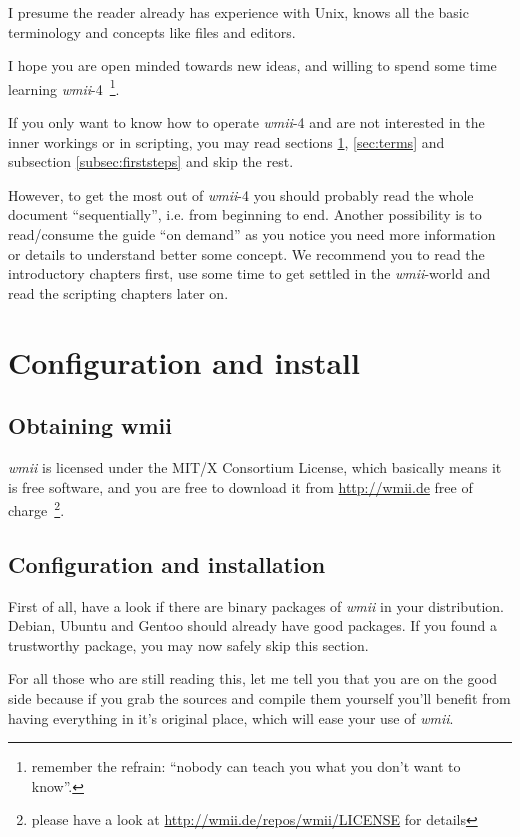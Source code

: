 \documentclass[12pt,a4paper]{article} %
\newcommand{\hrefx}[1]{\href{#1}{#1}} %
\newcommand{\wmii}{\emph{wmii}}
\begin{document}
    I presume the reader already has experience with Unix, knows all
    the basic terminology and concepts like files and editors.

    I hope you are open minded towards new ideas, and willing to spend some
    time learning \wmii-4~\footnote{remember the refrain: ``nobody
    can teach you what you don't want to know''.}.

    If you only want to know how to operate \wmii-4 and are not
    interested in the inner workings or in scripting, you may read
    sections \ref{sec:conf&install}, \ref{sec:terms} and subsection
    \ref{subsec:firststeps} and skip the rest.

    However, to get the most out of \wmii-4 you should probably read
    the whole document ``sequentially'', i.e. from beginning to end.
    Another possibility is to read/consume the guide ``on demand'' as
    you notice you need more information or details to understand
    better some concept. We recommend you to read the introductory
    chapters first, use some time to get settled in the \wmii-world
    and read the scripting chapters later on.
    
    \section{Configuration and install}
    \label{sec:conf&install}

    \subsection{Obtaining wmii}

    \wmii{} is licensed under the MIT/X Consortium License, which
    basically means it is free software, and you are free to download
    it from \hrefx{http://wmii.de} free of charge~\footnote{ please have
      a look at \hrefx{http://wmii.de/repos/wmii/LICENSE}  for
      details}.
    
    \subsection{Configuration and installation}
    
    First of all, have a look if there are binary packages of \wmii{} in
    your distribution. Debian, Ubuntu and Gentoo should already have
    good packages. If you found a trustworthy package, you may now safely
    skip this section.

    For all those who are still reading this, let me tell you that you are
    on the good side because if you grab the sources and compile them yourself
    you'll benefit from having everything in it's original place, which will
    ease your use of \wmii.
    
\end{document}
